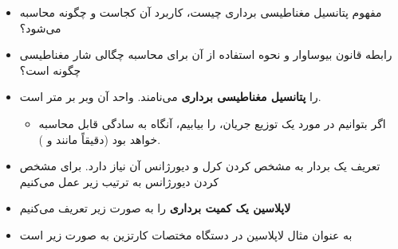 \begin{ELunit}


\begin{itemize}
\tightlist
\item
  مفهوم پتانسیل مغناطیسی برداری چیست، کاربرد آن کجاست و چگونه محاسبه می‌شود؟
\item
  رابطه قانون بیوساوار و نحوه استفاده از آن برای محاسبه چگالی شار مغناطیسی چگونه است؟
\end{itemize}


\begin{itemize}
\tightlist
\item
   را \textbf{پتانسیل مغناطیسی برداری} می‌نامند. واحد آن وبر بر متر است.

  \begin{itemize}
  \tightlist
  \item
    اگر بتوانیم در مورد یک توزیع جریان،  را بیابیم، آنگاه به سادگی  قابل محاسبه خواهد بود (دقیقاً مانند  و ).
  \end{itemize}
\item
  تعریف یک بردار به مشخص کردن کرل و دیورژانس آن نیاز دارد. برای مشخص کردن دیورژانس  به ترتیب زیر عمل می‌کنیم
\end{itemize}


\begin{itemize}
\tightlist
\item
  \textbf{لاپلاسین یک کمیت برداری} را به صورت زیر تعریف می‌کنیم
\end{itemize}


\begin{itemize}
\tightlist
\item
  به عنوان مثال لاپلاسین  در دستگاه مختصات کارتزین به صورت زیر است
\end{itemize}



\end{ELunit}
